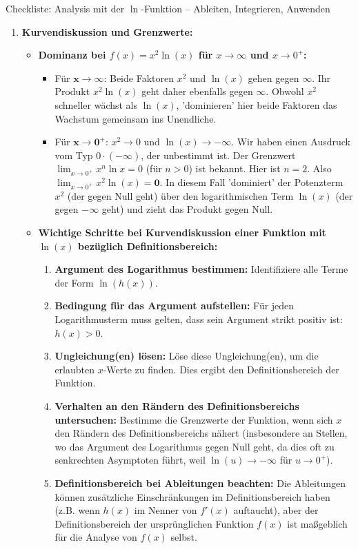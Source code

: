\begin{loesungsumgebung}{Checkliste: Analysis mit der $\ln$-Funktion – Ableiten, Integrieren, Anwenden}
\begin{enumerate}[label=(\alph*)]
    \item \textbf{Kurvendiskussion und Grenzwerte:}
    \begin{itemize}
        \item \textbf{Dominanz bei $f(x)=x^2 \ln(x)$ für $x \to \infty$ und $x \to 0^+$:}
        \begin{itemize}
            \item Für $\mathbf{x \to \infty}$: Beide Faktoren $x^2$ und $\ln(x)$ gehen gegen $\infty$. Ihr Produkt $x^2\ln(x)$ geht daher ebenfalls gegen $\mathbf{\infty}$. Obwohl $x^2$ schneller wächst als $\ln(x)$, 'dominieren' hier beide Faktoren das Wachstum gemeinsam ins Unendliche.
            \item Für $\mathbf{x \to 0^+}$: $x^2 \to 0$ und $\ln(x) \to -\infty$. Wir haben einen Ausdruck vom Typ $0 \cdot (-\infty)$, der unbestimmt ist. Der Grenzwert $\lim_{x \to 0^+} x^n \ln x = 0$ (für $n>0$) ist bekannt. Hier ist $n=2$.
            Also $\lim_{x \to 0^+} x^2 \ln(x) = \mathbf{0}$.
            In diesem Fall 'dominiert' der Potenzterm $x^2$ (der gegen Null geht) über den logarithmischen Term $\ln(x)$ (der gegen $-\infty$ geht) und zieht das Produkt gegen Null.
        \end{itemize}

        \item \textbf{Wichtige Schritte bei Kurvendiskussion einer Funktion mit $\ln(x)$ bezüglich Definitionsbereich:}
        \begin{enumerate}
            \item \textbf{Argument des Logarithmus bestimmen:} Identifiziere alle Terme der Form $\ln(h(x))$.
            \item \textbf{Bedingung für das Argument aufstellen:} Für jeden Logarithmusterm muss gelten, dass sein Argument strikt positiv ist: $h(x) > 0$.
            \item \textbf{Ungleichung(en) lösen:} Löse diese Ungleichung(en), um die erlaubten $x$-Werte zu finden. Dies ergibt den Definitionsbereich der Funktion.
            \item \textbf{Verhalten an den Rändern des Definitionsbereichs untersuchen:} Bestimme die Grenzwerte der Funktion, wenn sich $x$ den Rändern des Definitionsbereichs nähert (insbesondere an Stellen, wo das Argument des Logarithmus gegen Null geht, da dies oft zu senkrechten Asymptoten führt, weil $\ln(u) \to -\infty$ für $u \to 0^+$).
            \item \textbf{Definitionsbereich bei Ableitungen beachten:} Die Ableitungen können zusätzliche Einschränkungen im Definitionsbereich haben (z.B. wenn $h(x)$ im Nenner von $f'(x)$ auftaucht), aber der Definitionsbereich der ursprünglichen Funktion $f(x)$ ist maßgeblich für die Analyse von $f(x)$ selbst.
        \end{enumerate}
    \end{itemize}
\end{enumerate}

\end{loesungsumgebung}